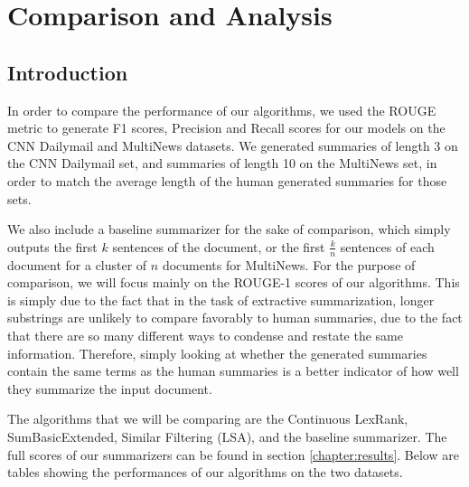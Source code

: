 \documentclass[../writeup.tex]{subfiles}
\begin{document}
\chapter{Comparison and Analysis}\label{chapter:group}


\section{Introduction}\label{group:sec:intro}
In order to compare the performance of our algorithms, we used the ROUGE metric to generate F1 scores, Precision and Recall scores for our models on the CNN Dailymail and MultiNews datasets.
We generated summaries of length 3 on the CNN Dailymail set, and summaries of length 10 on the MultiNews set, in order to match the average length of the human generated summaries for those sets.

We also include a baseline summarizer for the sake of comparison, which simply outputs the first $k$ sentences of the document, or the first $\frac{k}{n}$ sentences of each document for a cluster of $n$ documents for MultiNews.
For the purpose of comparison, we will focus mainly on the ROUGE-1 scores of our algorithms.
This is simply due to the fact that in the task of extractive summarization, longer substrings are unlikely to compare favorably to human summaries, due to the fact that there are so many different ways to condense and restate the same information.
Therefore, simply looking at whether the generated summaries contain the same terms as the human summaries is a better indicator of how well they summarize the input document.

The algorithms that we will be comparing are the Continuous LexRank, SumBasicExtended, Similar Filtering (LSA), and the baseline summarizer. The full scores of our summarizers can be found in section \ref{chapter:results}.
Below are tables showing the performances of our algorithms on the two datasets.
\end{document}
